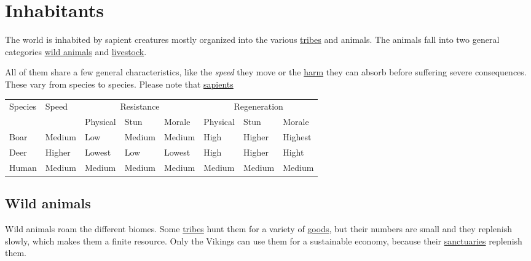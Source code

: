\section{Inhabitants}\label{ch:World:Inhabitants}

The world is inhabited by sapient creatures mostly organized into the various
\hyperref[ch:Tribes]{tribes} and animals. The animals fall into two general
categories \hyperref[ch:World:Inhabitants:Animals]{wild animals} and
\hyperref[ch:World:Inhbitants:Livestock]{livestock}.

All of them share a few general characteristics, like the \emph{speed} they
move or the \hyperref[ch:Conflict:Combat]{harm} they can absorb before
suffering severe consequences. These vary from species to species. Please note
that \hyperref[ch:World:Inhabitants:Sapients]{sapients}

\begin{longtable}{l l lll lll}
	\toprule
	Species    & Speed  & \multicolumn{3}{c}{Resistance} & \multicolumn{3}{c}{Regeneration}                                        \\
	           &        & Physical                       & Stun                             & Morale & Physical & Stun   & Morale  \\
	\midrule
	\Gls{Boar} & Medium & Low                            & Medium                           & Medium & High     & Higher & Highest \\
	\Gls{Deer} & Higher & Lowest                         & Low                              & Lowest & High     & Higher & Hight   \\
	Human      & Medium & Medium                         & Medium                           & Medium & Medium   & Medium & Medium  \\
	\bottomrule
\end{longtable}

\subsection{Wild animals}\label{ch:World:Inhabitants:Animals}

Wild animals roam the different biomes. Some \hyperref[ch:Tribes]{tribes} hunt
them for a variety of \hyperref[ch:Goods:Nature:Animals]{goods}, but their
numbers are small and they replenish slowly, which makes them a finite
resource. Only the \gls{Vikings} can use them for a sustainable economy,
because their \hyperref[ch:Tribes:Vikings:Religion:Forest]{sanctuaries}
replenish them.

